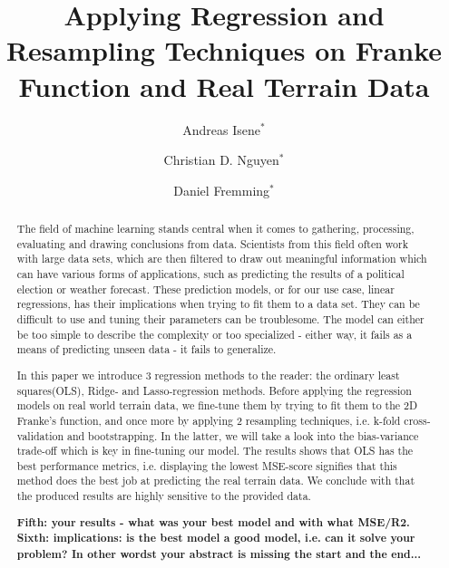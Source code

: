 \documentclass[aps,rmp,reprint,amsmath,amssymb,graphicx,longbibliography]{revtex4-1}
\begin{document}

\title{ Applying Regression and Resampling Techniques on Franke Function and Real Terrain Data }

\author{Andreas Isene$^*$}
\author{Christian D. Nguyen$^*$}
\author{Daniel Fremming$^*$}





\begin{abstract}


     
     The field of machine learning stands central when it comes to gathering, processing, evaluating and drawing conclusions from data. 
     Scientists from this field often work with large data sets, which are then filtered to draw out meaningful information which can have various forms of applications, such as predicting the results of a political election or weather forecast. These prediction models, or for our use case, linear regressions, has their implications when trying to fit them to a data set. They can be difficult to use and tuning their parameters can be troublesome. The model can either be too simple to describe the complexity or too specialized - either way, it fails as a means of predicting unseen data - it fails to generalize.
     
     In this paper we introduce 3 regression methods to the reader: the ordinary least squares(OLS), Ridge- and Lasso-regression methods. Before applying the regression models on real world terrain data, we fine-tune them by trying to fit them to the 2D Franke's function, and once more by applying 2 resampling techniques, i.e. k-fold cross-validation and bootstrapping. In the latter, we will take a look into the bias-variance trade-off which is key in fine-tuning our model. The results shows that OLS has the best performance metrics, i.e. displaying the lowest MSE-score signifies that this method does the best job at predicting the real terrain data. We conclude with that the produced results are highly sensitive to the provided data.
     
          
     \textbf{Fifth: your results - what was your best model and with what MSE/R2. Sixth: implications: is the best model a good model, i.e. can it solve your problem? In other wordst your abstract is missing the start and the end... }
     
\end{abstract}
\end{document}

